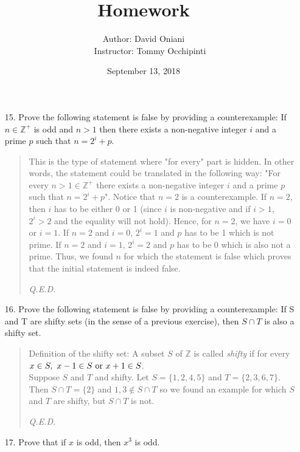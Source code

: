 \documentclass[12pt, a4paper]{article}                      %
\title{\bf{Homework \textnumero 4}}
\author{Author: David Oniani
\\
\ \ \ Instructor: Tommy Occhipinti}
\date{September 13, 2018}
\begin{document}
\maketitle


\begin{enumerate}
\item[15.]
Prove the following statement is false by providing a counterexample: If $n \in \mathbb{Z}^+$ is odd
and $n > 1$ then there exists a non-negative integer $i$ and a prime $p$ such that $n = 2^i + p$.
\\

\begin{quote}
This is the type of statement where "for every" part is hidden. In other words,
the statement could be translated in the following way: "For every $n > 1 \in \mathbb{Z}^+$
there exists a non-negative integer $i$ and a prime $p$ such that
$n = 2^i + p$". Notice that $n = 2$ is a counterexample. If $n = 2$, then $i$ has to be either 0 or 1 (since $i$ is non-negative and
if $i > 1$, $2^i > 2$ and the equality will not hold).
Hence, for $n = 2$, we have $i = 0$ or $i = 1$.
If $n = 2$ and $i = 0$, $2^i = 1$ and $p$ has to be 1 which is not prime.
If $n = 2$ and $i = 1$, $2^i = 2$ and $p$ has to be 0 which is also not a prime.
Thus, we found $n$ for which the statement is false which
proves that the initial statement is indeed false.
\begin{flushright}
\textit{Q.E.D.}
\end{flushright}
\end{quote}

\item[16.]
Prove the following statement is false by providing a counterexample:
If S and T are shifty sets (in the sense of a previous exercise), then $S \cap T$ is also a shifty set.
\begin{quote}
Definition of the shifty set: A subset $S$ of $\mathbb{Z}$ is called \textit{shifty} if for every $x \in S, \ x-1 \in S \ \textnormal{or} \ x + 1 \in S$.\\

Suppose $S$ and $T$ and shifty. Let $S = \{1,2,4,5\}$ and $T = \{2,3,6,7\}$.
Then $S \cap T = \{2\}$ and $1, 3 \notin S \cap T$ so we found an example for which
$S$ and $T$ are shifty, but $S \cap T$ is not.
\begin{flushright}
\textit{Q.E.D.}
\end{flushright}
\end{quote}

\item[17.]
Prove that if $x$ is odd, then $x^3$ is odd.


\end{enumerate}
\end{document}
